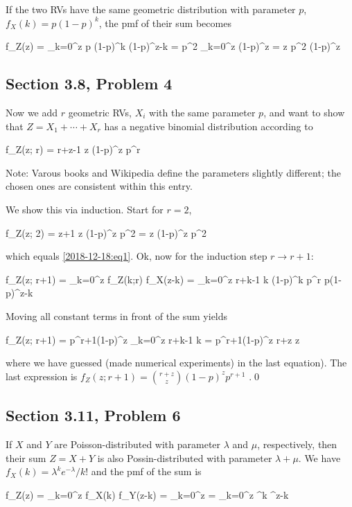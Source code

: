 If the two RVs have the same geometric distribution with parameter $p$, $f_X(k) = p(1-p)^ k$, the pmf of their sum becomes

\be\label{2018-12-18:eq1}
f_Z(z) = \sum_{k=0}^z p (1-p)^k (1-p)^{z-k} = p^2 \sum_{k=0}^z (1-p)^z = z p^2 (1-p)^z
\ee


\subsection{Section 3.8, Problem 4}

Now we add $r$ geometric RVs, $X_i$ with the same parameter $p$, and want to show that $Z = X_1 + \cdots + X_r$ has a negative binomial distribution according to

\bee
f_Z(z; r) = {r+z-1 \choose z} (1-p)^z p^r
\eee

Note: Varous books and Wikipedia define the parameters slightly different; the chosen ones are consistent within this entry.

We show this via induction. Start for $r=2$,

\bee
f_Z(z; 2) = {z+1 \choose z} (1-p)^z p^2 = z (1-p)^z p^2
\eee

which equals \eqref{2018-12-18:eq1}. Ok, now for the induction step $r \rightarrow r+1$:

\bee
f_Z(z; r+1) = \sum_{k=0}^z f_Z(k;r) f_X(z-k) = \sum_{k=0}^z {r+k-1 \choose k} (1-p)^k p^r p(1-p)^{z-k}
\eee

Moving all constant terms in front of the sum yields

\bee
f_Z(z; r+1) = p^{r+1}(1-p)^z \sum_{k=0}^z {r+k-1 \choose k} = p^{r+1}(1-p)^z {r+z \choose z}
\eee

where we have guessed (made numerical experiments) in the last equation). The last expression is $f_Z(z; r+1) = {r+z \choose z} (1-p)^z p^{r+1}$ .\qed

\subsection{Section 3.11, Problem 6}

If $X$ and $Y$ are Poisson-distributed with parameter $\lambda$ and $\mu$, respectively, then their sum $Z = X+Y$ is also Possin-distributed with parameter $\lambda + \mu$. We have $f_X(k) = \lambda^k e^{-\lambda}/k!$ and the pmf of the sum is

\bee
f_Z(z) = \sum_{k=0}^z f_X(k) f_Y(z-k) = \sum_{k=0}^z   =  \sum_{k=0}^z \lambda^k \mu^{z-k} 
\eee

